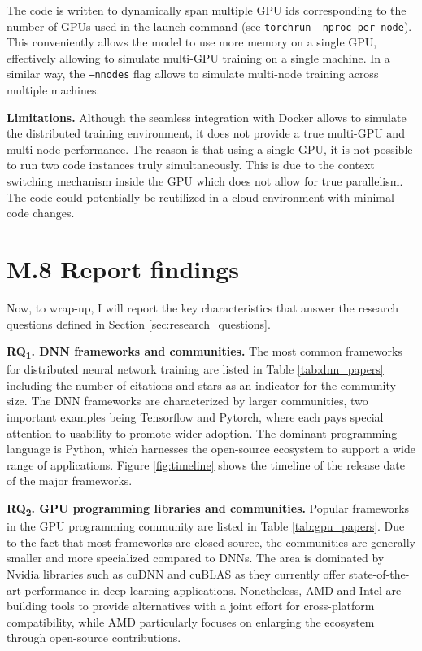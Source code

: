 The code is written to dynamically span multiple GPU ids corresponding to the number of GPUs used
in the launch command (see \texttt{torchrun --nproc\_per\_node}). This conveniently allows the
model to use more memory on a single GPU, effectively allowing to simulate multi-GPU training on a
single machine. In a similar way, the \texttt{--nnodes} flag allows to simulate multi-node training
across multiple machines.

\textbf{Limitations.}
Although the seamless integration with Docker allows to simulate the distributed training
environment, it does not provide a true multi-GPU and multi-node performance. The reason is that
using a single GPU, it is not possible to run two code instances truly simultaneously. This is due
to the context switching mechanism inside the GPU which does not allow for true parallelism. The
code could potentially be reutilized in a cloud environment with minimal code changes.

\section{M.8 Report findings}
\label{sec:report-findings}
Now, to wrap-up, I will report the key characteristics that answer the research questions defined
in Section \ref{sec:research_questions}.

\textbf{RQ\textsubscript{1}. DNN frameworks and communities.}
The most common frameworks for distributed neural network training are listed in Table
\ref{tab:dnn_papers} including the number of citations and stars as an indicator for the community
size. The DNN frameworks are characterized by larger communities, two important examples being
Tensorflow and Pytorch, where each pays special attention to usability to promote wider adoption.
The dominant programming language is Python, which harnesses the open-source ecosystem to support a
wide range of applications. Figure \ref{fig:timeline} shows the timeline of the release date of the
major frameworks.

\textbf{RQ\textsubscript{2}. GPU programming libraries and communities.}
Popular frameworks in the GPU programming community are listed in Table \ref{tab:gpu_papers}. Due
to the fact that most frameworks are closed-source, the communities are generally smaller and more
specialized compared to DNNs. The area is dominated by Nvidia libraries such as cuDNN and cuBLAS
as they currently offer state-of-the-art performance in deep learning applications. Nonetheless,
AMD and Intel are building tools to provide alternatives with a joint effort for cross-platform
compatibility, while AMD particularly focuses on enlarging the ecosystem through open-source
contributions.

